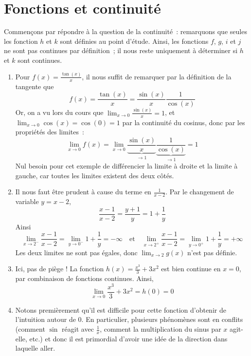 \part{Fonctions et continuité}
\begin{exercice}\label{ex:limits}
Commençons par répondre à la question de la continuité~: remarquons que seules les fonction $h$ et $k$ sont définies au point d'étude. Ainsi, les fonctions $f$, $g$, $i$ et $j$ ne sont pas continues par définition~; il nous reste uniquement à déterminer si $h$ et $k$ sont continues.
\begin{enumerate}
    \item Pour $f(x) = \frac{\tan(x)}{x}$, il nous suffit de remarquer par la définition de la tangente que
    \[
    f(x) = \frac{\tan(x)}{x} = \frac{\sin(x)}{x} \frac{1}{\cos(x)}
    \]
    Or, on a vu lors du cours que $\displaystyle\lim_{x \to 0} \frac{\sin(x)}{x} = 1$, et $\displaystyle\lim_{x \to 0} \cos(x) = \cos(0) = 1$ par la continuité du cosinus, donc par les propriétés des limites~:
    \[
    \lim_{x \to 0} f(x) = \lim_{x \to 0} \underbrace{\frac{\sin(x)}{x}}_{\to 1} \underbrace{\frac{1}{\cos(x)}}_{\to 1} = 1
    \]
    Nul besoin pour cet exemple de différencier la limite à droite et la limite à gauche, car toutes les limites existent des deux côtés.
    
    \item Il nous faut être prudent à cause du terme en $\frac{1}{x-2}$. Par le changement de variable $y = x-2$,
    \[
    \frac{x-1}{x-2} = \frac{y+1}{y} = 1 + \frac{1}{y}
    \]
    Ainsi
    \[
    \lim_{x \to 2^-} \frac{x-1}{x-2} = \lim_{y \to 0^-} 1 + \frac{1}{y} = -\infty \quad \textrm{et} \quad \lim_{x \to 2^+} \frac{x-1}{x-2} = \lim_{y \to 0^+} 1 + \frac{1}{y} = +\infty
    \]
    Les deux limites ne sont pas égales, donc $\displaystyle\lim_{x \to 2} g(x)$ n'est pas définie.
    
    \item Ici, pas de piège ! La fonction $h(x) = \frac{x^3}{3} + 3x^2$ est bien continue en $x = 0$, par combinaison de fonctions continues. Ainsi,
    \[
    \lim_{x \to 0} \frac{x^3}{3} + 3x^2 = h(0) = 0
    \]
    
    \item Notons premièrement qu'il est difficile pour cette fonction d'obtenir de l'intuition autour de $0$. En particulier, plusieurs phénomènes sont en conflits (comment $\sin$ réagit avec $\frac{1}{x}$, comment la multiplication du sinus par $x$ agit-elle, etc.) et donc il est primordial d'avoir une idée de la direction dans laquelle aller.
    

\end{enumerate}
\end{exercice}
